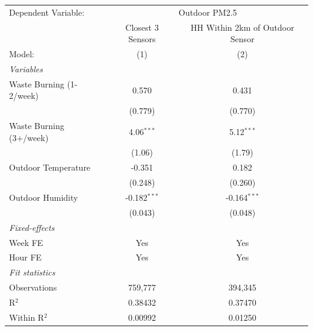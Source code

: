 
\begin{tabular}{lcc}
   \toprule
   Dependent Variable: & \multicolumn{2}{c}{Outdoor PM2.5}\\
                            & Closest 3 Sensors & HH Within 2km of Outdoor Sensor \\   
   Model:                   & (1)               & (2)\\  
   \midrule
   \emph{Variables}\\
   Waste Burning (1-2/week) & 0.570             & 0.431\\   
                            & (0.779)           & (0.770)\\   
   Waste Burning (3+/week)  & 4.06$^{***}$      & 5.12$^{***}$\\   
                            & (1.06)            & (1.79)\\   
   Outdoor Temperature      & -0.351            & 0.182\\   
                            & (0.248)           & (0.260)\\   
   Outdoor Humidity         & -0.182$^{***}$    & -0.164$^{***}$\\   
                            & (0.043)           & (0.048)\\   
   \midrule
   \emph{Fixed-effects}\\
   Week FE                  & Yes               & Yes\\  
   Hour FE                  & Yes               & Yes\\  
   \midrule
   \emph{Fit statistics}\\
   Observations             & 759,777           & 394,345\\  
   R$^2$                    & 0.38432           & 0.37470\\  
   Within R$^2$             & 0.00992           & 0.01250\\  
   \bottomrule
\end{tabular}


